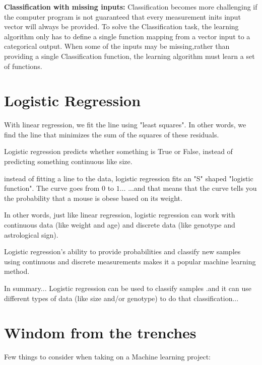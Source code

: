 \documentclass[openany]{book}
\begin{document}
\textbf{Classification with missing inputs:} Classification becomes more challenging if the computer program is not guaranteed that every measurement inits input vector will always be provided. To solve the Classification task, the learning algorithm only has to define a single function mapping from a vector input to a categorical output. When some of the inputs may be missing,rather than providing a single Classification function, the learning algorithm must learn a set of functions.



\section{Logistic Regression}

With linear regression, we fit the line using "least squares". In other words, we find the line that minimizes the sum of the squares of these residuals. 

Logistic regression predicts whether something is True or False, instead of predicting something continuous like size.

 instead of fitting a line to the data, logistic regression fits an "S" shaped "logistic function". The curve goes from 0 to $1 \ldots$ ...and that means that the curve tells you the probability that a mouse is obese based on its weight.

In other words, just like linear regression, logistic regression can work with continuous data (like weight and age) and discrete data (like genotype and astrological sign).

Logistic regression's ability to provide probabilities and classify new samples using continuous and discrete measurements makes it a popular machine learning method.

In summary... Logistic regression can be used to classify
samples .and it can use different types of data (like size and/or genotype) to do that classification...


\section{Windom from the trenches}

Few things to consider when taking on a Machine learning project: 
\end{document}
